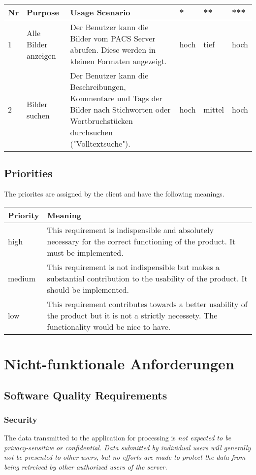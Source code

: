 \begin{tabularx}{\textwidth}{
	>{\raggedright}p{0.5cm}
	>{\raggedright}p{2.4cm}
	>{\raggedright}X
	l
	l
	l
}
	  Nr
	& Purpose
	& Usage Scenario
	& *
	& **
	& ***
\\\toprule
	  1
	& Alle Bilder anzeigen
	& Der Benutzer kann die Bilder vom PACS Server abrufen.
	  Diese werden in kleinen Formaten angezeigt.
	& hoch & tief & hoch
\\\midrule
	  2
	& Bilder suchen
	& Der Benutzer kann die Beschreibungen, Kommentare und Tags der Bilder nach Stichworten
	  oder Wortbruchstücken durchsuchen ("Volltextsuche").
	& hoch & mittel & hoch
\\\bottomrule
\end{tabularx}

\subsection{Priorities}
The priorites are assigned by the client and have the following meanings.

\begin{tabularx}{\textwidth}{l|X}
	Priority & Meaning
\\\hline
	  high
	& This requirement is indispensible and absolutely necessary for the correct functioning of the product. It must be implemented.
\\\hline
	  medium
	& This requirement is not indispensible but makes a substantial contribution to the usability of the product. It should be implemented.
\\\hline
	  low
	& This requirement contributes towards a better usability of the product but it is not a strictly necessety. The functionality would be nice to have.
\end{tabularx}

	\section{Nicht-funktionale Anforderungen}

\subsection{Software Quality Requirements}
\subsubsection{Security}
The data transmitted to the application for processing is \em{not} expected to be privacy-sensitive or confidential. Data submitted by individual users will generally not be presented to other users, but no efforts are made to protect the data from being retreived by other authorized users of the server.

